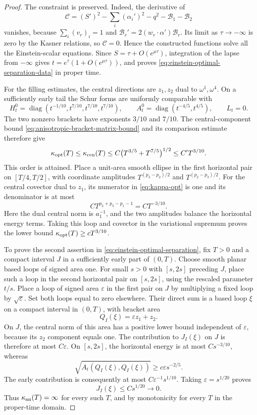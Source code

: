 \documentclass[10pt,a4paper]{article}
\numberwithin{equation}{section}
\theoremstyle{definition}
\theoremstyle{remark}
\begin{document}
\begin{proof}
The constraint is preserved.  Indeed, the derivative of
\[
 \mathcal C=(S')^2-\sum_i(\alpha_i')^2-q^2
                  -\mathcal B_1-\mathcal B_2
\]
vanishes, because $\sum_i(v_r)_i=1$ and
$\mathcal B_r'=2(w_r\cdot\alpha')\mathcal B_r$.
Its limit as $\tau\to-\infty$ is zero by the Kasner relations, so
$\mathcal C=0$.  Hence the constructed functions solve all the
Einstein-scalar equations.  Since
$S=\tau+O(e^{\mu\tau})$, integration of the lapse from $-\infty$
gives $t=e^\tau(1+O(e^{\mu\tau}))$, and proves
\eqref{eq:einstein-optimal-separation-data} in proper time.

For the filling estimates, the central directions are $z_1,z_2$
dual to $\omega^1,\omega^4$.  On a sufficiently early tail the Schur
forms are uniformly comparable with
\begin{equation}
 H_t^0=\operatorname{diag}
    (t^{-1/10},t^{7/10},t^{7/10},t^{7/10}),
 \qquad
 A_t^0=\operatorname{diag}(t^{-4/5},t^{4/5}),
 \qquad L_t=0.
 \label{eq:einstein-optimal-schur-powers}
\end{equation}
The two nonzero brackets have exponents $3/10$ and $7/10$.
The central-component bound
\eqref{eq:anisotropic-bracket-matrix-bound} and its comparison
estimate therefore give
\[
 \kappa_{\rm opt}(T)\le\kappa_{\rm cen}(T)
       \le C\bigl(T^{3/5}+T^{7/5}\bigr)^{1/2}
       \le C' T^{3/10}.
\]
This order is attained.  Place a unit-area smooth ellipse in the
first horizontal pair on $[T/4,T/2]$, with coordinate amplitudes
$T^{(p_3-p_2)/2}$ and $T^{(p_2-p_3)/2}$.
For the central covector dual to $z_1$, its numerator in
\eqref{eq:kappa-opt} is one and its denominator is at most
\[
 C T^{p_2+p_3-p_1-1}=C T^{-3/10}.
\]
Here the dual central norm is $a_1^{-1}$, and the two amplitudes
balance the horizontal energy terms.  Taking this loop and covector
in the variational supremum proves the lower bound
$\kappa_{\rm opt}(T)\ge cT^{3/10}$.

To prove the second assertion in
\eqref{eq:einstein-optimal-separation}, fix $T>0$ and a compact
interval $J$ in a sufficiently early part of $(0,T)$.
Choose smooth planar based loops of signed area one.  For small
$s>0$ with $[s,2s]$ preceding $J$, place such a loop in the second
horizontal pair on $[s,2s]$, using the rescaled parameter $t/s$.
Place a loop of signed area $\varepsilon$ in the first pair on $J$
by multiplying a fixed loop by $\sqrt\varepsilon$.  Set both loops
equal to zero elsewhere.  Their direct sum is a based loop $\xi$
on a compact interval in $(0,T)$, with bracket area
\[
 Q_I(\xi)=\varepsilon z_1+z_2.
\]
On $J$, the central norm of this area has a positive lower bound
independent of $\varepsilon$, because its $z_2$ component equals one.
The contribution to $J_I(\xi)$ on $J$ is therefore at most
$C\varepsilon$.  On $[s,2s]$, the horizontal energy is at most
$C s^{-3/10}$, whereas
\[
 \sqrt{A_t(Q_I(\xi),Q_I(\xi))}
       \ge c\varepsilon s^{-2/5}.
\]
The early contribution is consequently at most
$C\varepsilon^{-1}s^{1/10}$.  Taking
$\varepsilon=s^{1/20}$ proves
\[
 J_I(\xi)\le C s^{1/20}\longrightarrow0.
\]
Thus $\kappa_{\rm an}(T)=\infty$ for every such $T$, and by
monotonicity for every $T$ in the proper-time domain.


\end{proof}
\end{document}
